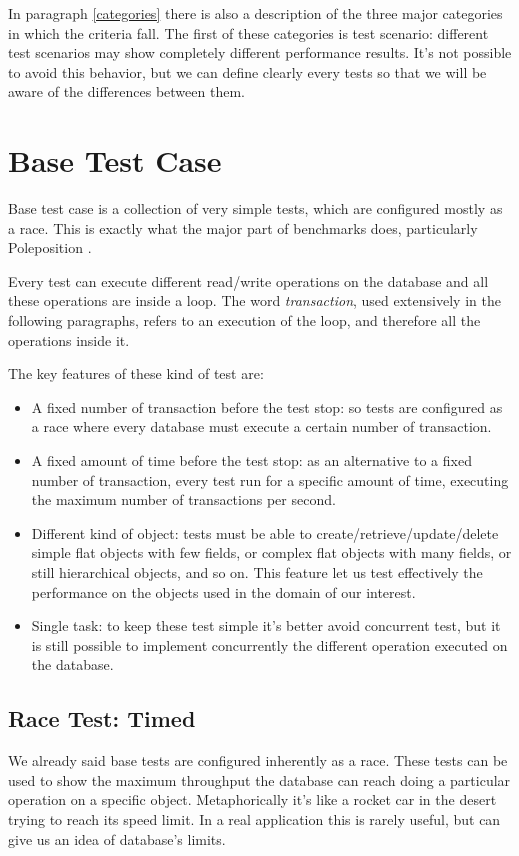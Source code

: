 In paragraph \ref{categories} there is also a description of the three major categories in which the criteria fall. The first of these categories is test scenario: different test scenarios may show completely different performance results. It's not possible to avoid this behavior, but we can define clearly every tests so that we will be aware of the differences between them.

	\section{Base Test Case}
Base test case is a collection of very simple tests, which are configured mostly as a race. This is exactly what the major part of benchmarks does, particularly Poleposition \cite{poleposition}.

Every test can execute different read/write operations on the database and all these operations are inside a loop. The word \emph{transaction}, used extensively in the following paragraphs, refers to an execution of the loop, and therefore all the operations inside it.

The key features of these kind of test are:
\begin{itemize}
	\item A fixed number of transaction before the test stop: so tests are configured as a race where every database must execute a certain number of transaction.
	\item A fixed amount of time before the test stop: as an alternative to a fixed number of transaction, every test run for a specific amount of time, executing the maximum number of transactions per second. 
	\item Different kind of object: tests must be able to create/retrieve/update/delete simple flat objects with few fields, or complex flat objects with many fields, or still hierarchical objects, and so on. This feature let us test effectively the performance on the objects used in the domain of our interest.
	\item Single task: to keep these test simple it's better avoid concurrent test, but it is still possible to implement concurrently the different operation executed on the database.
\end{itemize}
	
		\subsection{Race Test: Timed}
We already said base tests are configured inherently as a race. These tests can be used to show the maximum throughput the database can reach doing a particular operation on a specific object. Metaphorically it's like a rocket car in the desert trying to reach its speed limit. In a real application this is rarely useful, but can give us an idea of database's limits. 

